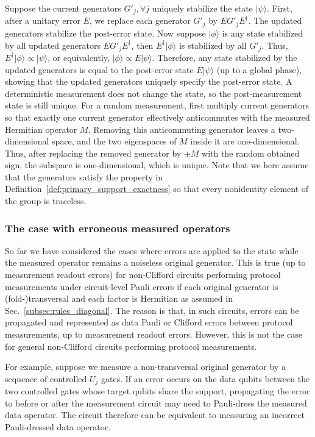 \documentclass[
 reprint,
 amsmath,amssymb,
 pra,superscriptaddress, nofootinbib
]{revtex4-2}
\theoremstyle{definition}
\theoremstyle{plain}
\begin{document}
Suppose the current generators $G'_j, \forall j$ uniquely stabilize the state $|\psi\rangle$.
First, after a unitary error $E$, we replace each generator $G'_j$ by $EG'_jE^\dagger$. The updated generators stabilize the post-error state. Now suppose $|\phi\rangle$ is any state stabilized by all updated generators $EG'_jE^\dagger$, then $E^\dagger|\phi\rangle$ is stabilized by all $G'_j$. Thus, $E^\dagger|\phi\rangle \propto |\psi\rangle$, or equivalently, $|\phi\rangle \propto E|\psi\rangle$.
Therefore, any state stabilized by the updated generators is equal to the post-error state $E|\psi\rangle$ (up to a global phase), showing that the updated generators uniquely specify the post-error state.
A deterministic measurement does not change the state, so the post-measurement state is still unique.
For a random measurement, first multiply current generators so that exactly one current generator effectively anticommutes with the measured Hermitian operator $M$. Removing this anticommuting generator leaves a two-dimensional space, and the two eigenspaces of $M$ inside it are one-dimensional. Thus, after replacing the removed generator by $\pm M$ with the random obtained sign, the subspace is one-dimensional, which is unique.
Note that we here assume that the generators satisfy the property in Definition~\ref{def:primary_support_exactness} so that every nonidentity element of the group is traceless.

\subsubsection{The case with erroneous measured operators}
\label{subsubsec:effective}
So far we have considered the cases where errors are applied to the state while the measured operator remains a noiseless original generator.
This is true (up to measurement readout errors) for non-Clifford circuits performing protocol measurements under circuit-level Pauli errors if each original generator is (fold-)transversal and each factor is Hermitian as assumed in Sec.~\ref{subsec:rules_diagonal}.
The reason is that, in such circuits, errors can be propagated and represented as data Pauli or Clifford errors between protocol measurements, up to measurement readout errors.
However, this is not the case for general non-Clifford circuits performing protocol measurements.

For example, suppose we measure a non-transversal original generator by a sequence of controlled-$U_j$ gates. If an error occurs on the data qubits between the two controlled gates whose target qubits share the support, propagating the error to before or after the measurement circuit may need to Pauli-dress the measured data operator. The circuit therefore can be equivalent to measuring an incorrect Pauli-dressed data operator. 
\end{document}
